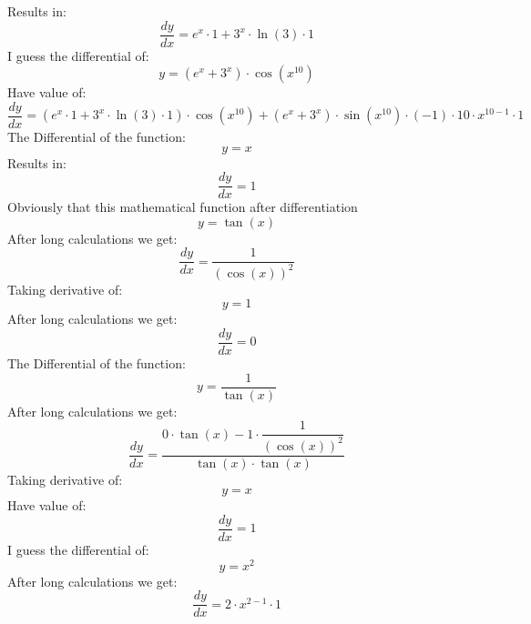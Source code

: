 \documentclass{article}
\begin{document}
\begin{center}
\begin{dmath}
\end{dmath}
Results in:
\begin{dmath}
 \frac{dy}{dx} = e^{x}\cdot 1+3^{x}\cdot \ln (3)\cdot 1
\end{dmath}
I guess the differential of:
\begin{dmath}
 y = (e^{x}+3^{x})\cdot \cos (x^{10})
\end{dmath}
Have value of:
\begin{dmath}
 \frac{dy}{dx} = (e^{x}\cdot 1+3^{x}\cdot \ln (3)\cdot 1)\cdot \cos (x^{10})+(e^{x}+3^{x})\cdot \sin (x^{10})\cdot (-1)\cdot 10\cdot x^{10-1}\cdot 1
\end{dmath}
The Differential of the function:
\begin{dmath}
 y = x
\end{dmath}
Results in:
\begin{dmath}
 \frac{dy}{dx} = 1
\end{dmath}
Obviously that this mathematical function after differentiation
\begin{dmath}
 y = \tan (x)
\end{dmath}
After long calculations we get:
\begin{dmath}
 \frac{dy}{dx} = \dfrac{1}{(\cos (x))^{2}}
\end{dmath}
Taking derivative of:
\begin{dmath}
 y = 1
\end{dmath}
After long calculations we get:
\begin{dmath}
 \frac{dy}{dx} = 0
\end{dmath}
The Differential of the function:
\begin{dmath}
 y = \dfrac{1}{\tan (x)}
\end{dmath}
After long calculations we get:
\begin{dmath}
 \frac{dy}{dx} = \dfrac{0\cdot \tan (x)-1\cdot \dfrac{1}{(\cos (x))^{2}}}{\tan (x)\cdot \tan (x)}
\end{dmath}
Taking derivative of:
\begin{dmath}
 y = x
\end{dmath}
Have value of:
\begin{dmath}
 \frac{dy}{dx} = 1
\end{dmath}
I guess the differential of:
\begin{dmath}
 y = x^{2}
\end{dmath}
After long calculations we get:
\begin{dmath}
 \frac{dy}{dx} = 2\cdot x^{2-1}\cdot 1
\end{dmath}

\end{center}
\end{document}
